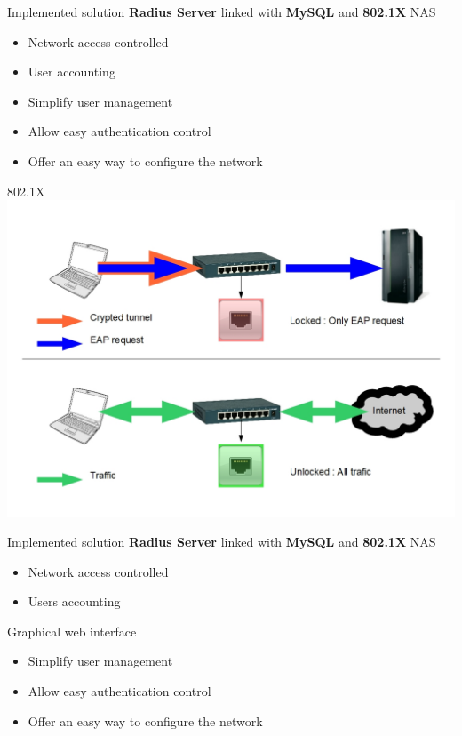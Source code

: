 \documentclass[12pt]{beamer}
\begin{document}
\begin{frame}{Implemented solution}
    \textbf{Radius Server} linked with \textbf{MySQL} and \textbf{802.1X} NAS
    \begin{itemize}
	\item<1-2> Network access controlled
	\item<2> User accounting
    \end{itemize}
    \vfill
    \begin{itemize}
	\item<0> Simplify user management
	\item<0> Allow easy authentication control
	\item<0> Offer an easy way to configure the network
    \end{itemize}
    \vfill
\end{frame}
	
\begin{frame}{802.1X}
    \includegraphics[width=300pts]{img/dot1x.jpg}
\end{frame}

\begin{frame}{Implemented solution}
    \textbf{Radius Server} linked with \textbf{MySQL} and \textbf{802.1X} NAS
    \begin{itemize}
	\item Network access controlled
	\item Users accounting
    \end{itemize}
    \vfill
    Graphical web interface
    \begin{itemize}
	\item<1-> Simplify user management
	\item<2-> Allow easy authentication control
	\item<3-> Offer an easy way to configure the network
    \end{itemize}
    \vfill
\end{frame}
\end{document}
